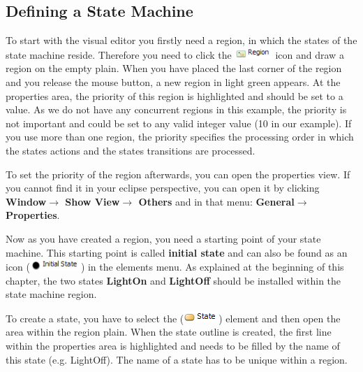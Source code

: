 \subsection{Defining a State Machine}


To start with the visual editor you firstly need a region, in which the states of
the state machine reside. Therefore you need to click the
\includegraphics[height=12pt]{./Pictures/Region} icon and draw a region on the
empty plain. When you have placed the last corner of the region and you release
the mouse button, a new region in light green appears. At the properties area,
the priority of this region is highlighted and should be set to a value. As we do
not have any concurrent regions in this example, the priority is not important
and could be set to any valid integer value (10 in our example). If you use more
than one region, the priority specifies the processing order in which the states
actions and the states transitions are processed.


To set the priority of the region afterwards, you can open the properties view.
If you cannot find it in your eclipse perspective, you can open it by clicking
\textbf{Window$\rightarrow$ Show View$\rightarrow$ Others} and in that menu:
\textbf{General$\rightarrow$ Properties}.

Now as you have created a region, you need a starting point of your state
machine. This starting point is called \textbf{initial state} and can also be
found as an icon (\includegraphics[height=12pt]{./Pictures/InitialState}) in the
elements menu. As explained at the beginning of this chapter, the two states
\textbf{LightOn} and \textbf{LightOff} should be installed within the state
machine region.

To create a state, you have to select the
(\includegraphics[height=12pt]{./Pictures/State}) element and then open the area
within the region plain. When the state outline is created, the first line within
the properties area is highlighted and needs to be filled by the name of this
state (e.g. LightOff). The name of a state has to be unique within a region.

